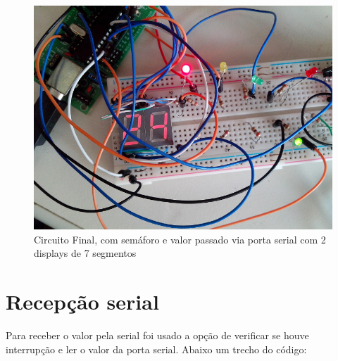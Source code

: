 \begin{figure}[h]
    \centering
    \includegraphics[scale=0.5]{img/IMG_20161006_103716.jpg}
    \caption{Circuito Final, com semáforo e valor passado via porta serial com 2 displays de 7 segmentos}\label{fig:circuito3}
\end{figure}

\section{Recepção serial}\label{recepuxe7uxe3o-serial}

Para receber o valor pela serial foi usado a opção de verificar se houve
interrupção e ler o valor da porta serial. Abaixo um trecho do código:

\begin{Shaded}
\begin{Highlighting}[]
 
 \NormalTok{comando[}\NormalTok{];}
 \NormalTok{;}
 \NormalTok{;}
 
     
        \NormalTok{;}
         \NormalTok{) \{}
        \NormalTok{\} } \NormalTok{\{}
            \NormalTok{;}
            \NormalTok{;}
        \NormalTok{\}}
    \NormalTok{\}}
\NormalTok{\}}
\end{Highlighting}
\end{Shaded}

